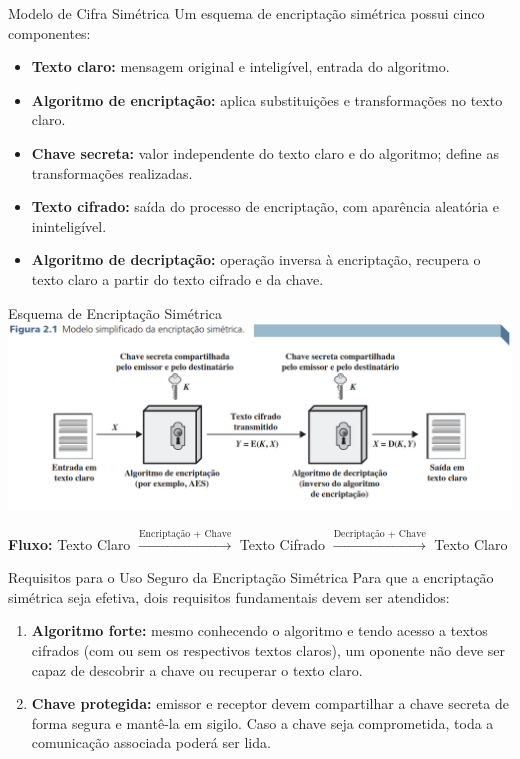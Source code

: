 \begin{frame}{Modelo de Cifra Simétrica}
    Um esquema de encriptação simétrica possui cinco componentes:

    \begin{itemize}
        \item \textbf{Texto claro:} mensagem original e inteligível, entrada do algoritmo.
        \item \textbf{Algoritmo de encriptação:} aplica substituições e transformações no texto claro.
        \item \textbf{Chave secreta:} valor independente do texto claro e do algoritmo; define as transformações realizadas.
        \item \textbf{Texto cifrado:} saída do processo de encriptação, com aparência aleatória e ininteligível.
        \item \textbf{Algoritmo de decriptação:} operação inversa à encriptação, recupera o texto claro a partir do texto cifrado e da chave.
    \end{itemize}
\end{frame}

\begin{frame}{Esquema de Encriptação Simétrica}
    \centering
    \includegraphics[width=\linewidth]{Figuras/modelo-cripto-simetrica.png}

    \vspace{0.3cm}
    \textbf{Fluxo:} Texto Claro $\xrightarrow{\text{Encriptação + Chave}}$ Texto Cifrado $\xrightarrow{\text{Decriptação + Chave}}$ Texto Claro
\end{frame}

\begin{frame}{Requisitos para o Uso Seguro da Encriptação Simétrica}
    Para que a encriptação simétrica seja efetiva, dois requisitos fundamentais devem ser atendidos:

    \begin{enumerate}
        \item \textbf{Algoritmo forte:} mesmo conhecendo o algoritmo e tendo acesso a textos cifrados (com ou sem os respectivos textos claros), um oponente não deve ser capaz de descobrir a chave ou recuperar o texto claro.
        \item \textbf{Chave protegida:} emissor e receptor devem compartilhar a chave secreta de forma segura e mantê-la em sigilo. Caso a chave seja comprometida, toda a comunicação associada poderá ser lida.
    \end{enumerate}
\end{frame}

